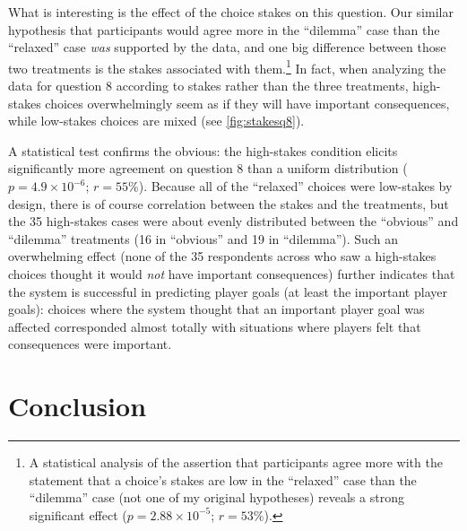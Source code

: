 What is interesting is the effect of the choice stakes on this question.
%
Our similar hypothesis that participants would agree more in the ``dilemma'' case than the ``relaxed'' case \emph{was} supported by the data, and one big difference between those two treatments is the stakes associated with them.\footnote{A statistical analysis of the assertion that participants agree more with the statement that a choice's stakes are low in the ``relaxed'' case than the ``dilemma'' case (not one of my original hypotheses) reveals a strong significant effect ($p = 2.88\times10^{-5}$; $r = 53\%$).}
%
In fact, when analyzing the data for question 8 according to stakes rather than the three treatments, high-stakes choices overwhelmingly seem as if they will have important consequences, while low-stakes choices are mixed (see \cref{fig:stakesq8}).


A statistical test confirms the obvious: the high-stakes condition elicits significantly more agreement on question 8 than a uniform distribution ($p = 4.9\times10^{-6}$; $r = 55$\%).
%
Because all of the ``relaxed'' choices were low-stakes by design, there is of course correlation between the stakes and the treatments, but the 35 high-stakes cases were about evenly distributed between the ``obvious'' and ``dilemma'' treatments (16 in ``obvious'' and 19 in ``dilemma'').
%
Such an overwhelming effect (none of the 35 respondents across who saw a high-stakes choices thought it would \emph{not} have important consequences) further indicates that the system is successful in predicting player goals (at least the important player goals): choices where the system thought that an important player goal was affected corresponded almost totally with situations where players felt that consequences were important.


\section{Conclusion}

